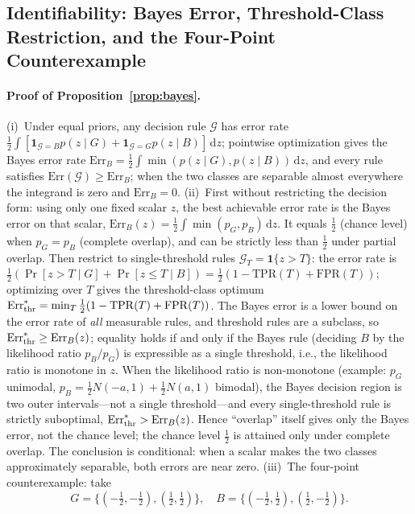 \documentclass[11pt]{article}
\newcommand{\dd}{\,\mathrm d}
\numberwithin{equation}{section}
\begin{document}
\subsection{Identifiability: Bayes Error, Threshold-Class Restriction, and the Four-Point Counterexample}
\paragraph{Proof of Proposition~\ref{prop:bayes}.}
(i)~Under equal priors, any decision rule $\mathcal G$ has error rate $\tfrac12\int[\mathbf1_{\mathcal G=B}p(z\mid G)+\mathbf1_{\mathcal G=G}p(z\mid B)]\dd z$; pointwise optimization gives the Bayes error rate $\mathrm{Err}_B=\tfrac12\int\min(p(z\mid G),p(z\mid B))\dd z$, and every rule satisfies $\mathrm{Err}(\mathcal G)\ge\mathrm{Err}_B$; when the two classes are separable almost everywhere the integrand is zero and $\mathrm{Err}_B=0$. (ii)~First without restricting the decision form: using only one fixed scalar $z$, the best achievable error rate is the Bayes error on that scalar, $\mathrm{Err}_B(z)=\tfrac12\int\min(p_G,p_B)\dd z$. It equals $\tfrac12$ (chance level) when $p_G=p_B$ (complete overlap), and can be strictly less than $\tfrac12$ under partial overlap. Then restrict to single-threshold rules $\mathcal G_T=\mathbf1\{z>T\}$: the error rate is $\tfrac12(\Pr[z>T\mid G]+\Pr[z\le T\mid B])=\tfrac12(1-\mathrm{TPR}(T)+\mathrm{FPR}(T))$; optimizing over $T$ gives the threshold-class optimum $\mathrm{Err}_{\rm thr}^*=\min_T\tfrac12(1-\mathrm{TPR}(T)+\mathrm{FPR}(T))$. The Bayes error is a lower bound on the error rate of \emph{all} measurable rules, and threshold rules are a subclass, so $\mathrm{Err}_{\rm thr}^*\ge\mathrm{Err}_B(z)$; equality holds if and only if the Bayes rule (deciding $B$ by the likelihood ratio $p_B/p_G$) is expressible as a single threshold, i.e., the likelihood ratio is monotone in $z$. When the likelihood ratio is non-monotone (example: $p_G$ unimodal, $p_B=\tfrac12N(-a,1)+\tfrac12N(a,1)$ bimodal), the Bayes decision region is two outer intervals---not a single threshold---and every single-threshold rule is strictly suboptimal, $\mathrm{Err}_{\rm thr}^*>\mathrm{Err}_B(z)$. Hence ``overlap'' itself gives only the Bayes error, not the chance level; the chance level $\tfrac12$ is attained only under complete overlap. The conclusion is conditional: when a scalar makes the two classes approximately separable, both errors are near zero. (iii)~The four-point counterexample: take
\[
G=\{(-\tfrac12,-\tfrac12),(\tfrac12,\tfrac12)\},\quad
B=\{(-\tfrac12,\tfrac12),(\tfrac12,-\tfrac12)\}.
\]
\end{document}
